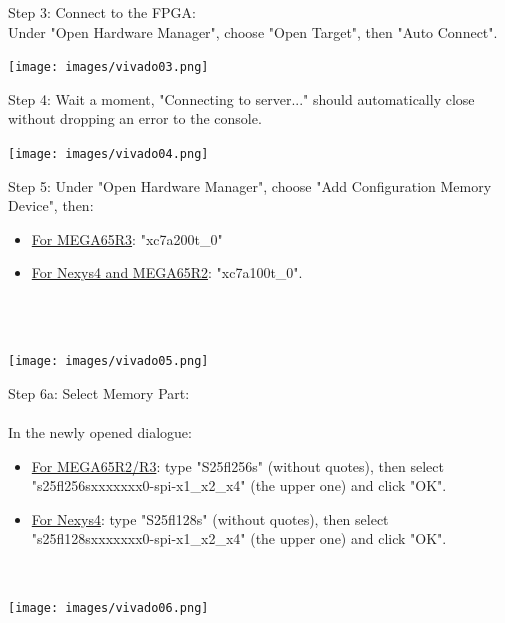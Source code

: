 \begin{minipage}{\linewidth}
  Step 3: Connect to the FPGA: \\
  Under "Open Hardware Manager", choose "Open Target", then "Auto Connect".
  \\
  \begin{center}
    \texttt{[image: images/vivado03.png]}
  \end{center}
\end{minipage}

\vspace{5mm}

\begin{minipage}{\linewidth}
  Step 4: Wait a moment, "Connecting to server..."  should
  automatically close without dropping an error to the console.
  \\
  \begin{center}
    \texttt{[image: images/vivado04.png]}
  \end{center}
\end{minipage}


\begin{minipage}{\linewidth}
  Step 5: Under "Open Hardware Manager", choose "Add Configuration
  Memory Device", then:
  \begin{itemize}
    \item \underline{For MEGA65R3}: "xc7a200t\_0"
    \item \underline{For Nexys4 and MEGA65R2}: "xc7a100t\_0".
  \end{itemize}
  \\
  \\
  \begin{center}
    \texttt{[image: images/vivado05.png]}
  \end{center}
\end{minipage}

\vspace{5mm}

\begin{minipage}{\linewidth}
  Step 6a: Select Memory Part: \\
  \\
  In the newly opened dialogue:
  \begin{itemize}
    \item \underline{For MEGA65R2/R3}: type "S25fl256s"
    (without quotes), then select "s25fl256sxxxxxxx0-spi-x1\_x2\_x4"
    (the upper one) and click "OK".
    \item \underline{For Nexys4}: type "S25fl128s"
    (without quotes), then select "s25fl128sxxxxxxx0-spi-x1\_x2\_x4"
    (the upper one) and click "OK".
  \end{itemize}
  \\
  \begin{center}
    \texttt{[image: images/vivado06.png]}
  \end{center}
\end{minipage}

